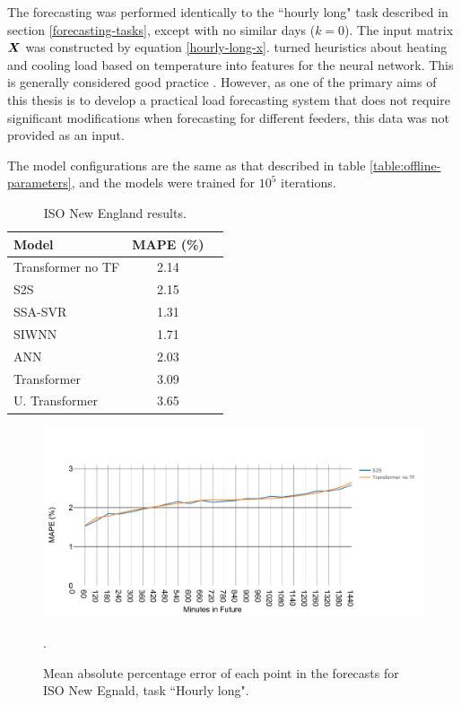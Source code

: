 The forecasting was performed identically to the ``hourly long" task described in section \ref{forecasting-tasks}, except with no similar days ($k=0$).
The input matrix ${\bm{X}}$ was constructed by equation \ref{hourly-long-x}.
\citet{Ceperic2013} turned heuristics about heating and cooling load based on temperature into features for the neural network.
This is generally considered good practice \cite{Zinkevich2018}.
However, as one of the primary aims of this thesis is to develop a practical load forecasting system that does not require significant modifications when forecasting for different feeders, this data was not provided as an input.

The model configurations are the same as that described in table \ref{table:offline-parameters}, and the models were trained for $10^5$ iterations.

\begin{table}[htbp]
	\caption{ISO New England results.}
	\begin{center}
		\begin{tabular}{l|cc}
			\textbf{Model}&\textbf{MAPE (\%)} \\
			\hline
			Transformer no TF            & 2.14 \\ %
			S2S                          & 2.15 \\ %
			SSA-SVR \cite{Ceperic2013}   & 1.31 \\
			SIWNN \cite{Chen2010}        & 1.71 \\
			ANN \cite{Chen2010}          & 2.03 \\
			Transformer                  & 3.09 \\ %
			U. Transformer               & 3.65 \\ %
			
		\end{tabular}
		\label{table:iso-results}
	\end{center}
\end{table}

\begin{figure}[htbp]
	\centerline{\includegraphics[width=.9\textwidth]{images/iso_mape.pdf}}
	\caption{Mean absolute percentage error of each point in the forecasts for ISO New Egnald, task ``Hourly long".}.
	\label{fig:iso_mape}
\end{figure}

